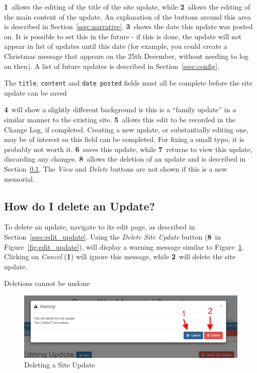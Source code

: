 \documentclass[12pt]{article}
\newcommand{\marker}[1]{\color{red}\textbf{#1}\color{black}}
\begin{document}
\marker{1}\ allows the editing of the title of the site update, while \marker{2}\ allows the editing of the main content of the update. An explanation of the buttons around this area is described in Section~\ref{ssec:narrative}. \marker{3}\ shows the date this update was posted on. It is possible to set this in the future - if this is done, the update will not appear in list of updates until this date (for example, you could create a Christmas message that appears on the 25th December, without needing to log on then). A list of future updates is described in Section~\ref{ssec:config}.

\begin{infoBox}
The \texttt{title}, \texttt{content} and \texttt{date posted} fields must all be complete before the site update can be saved
\end{infoBox}

\marker{4}\ will show a slightly different background is this is a ``family update'' in a similar manner to the existing site. \marker{5}\ allows this edit to be recorded in the Change Log, if completed. Creating a new update, or substantially editing one, may be of interest so this field can be completed. For fixing a small typo, it is probably not worth it. \marker{6}\ saves this update, while \marker{7}\ returns to view this update, discarding any changes. \marker{8}\ allows the deletion of an update and is described in Section~\ref{ssec:delete_update}. The \textit{View} and \textit{Delete} buttons are not shown if this is a new memorial.

\FloatBarrier
\subsection{How do I delete an Update?}\label{ssec:delete_update}
To delete an update, navigate to its edit page, as described in Section~\ref{ssec:edit_update}. Using the \textit{Delete Site Update} button (\marker{8}\ in Figure~\ref{fig:edit_update}), will display a warning message similar to Figure~\ref{fig:delete_update}. Clicking on \textit{Cancel} (\marker{1}) will ignore this message, while \marker{2}\ will delete the site update.

\begin{warningBox}
Deletions cannot be undone
\end{warningBox}

\begin{figure}[h]
  \centering
 \includegraphics[width=.9\textwidth]{pics/delete_update.png}
	\caption{Deleting a Site Update}\label{fig:delete_update}
\end{figure}
\end{document}
